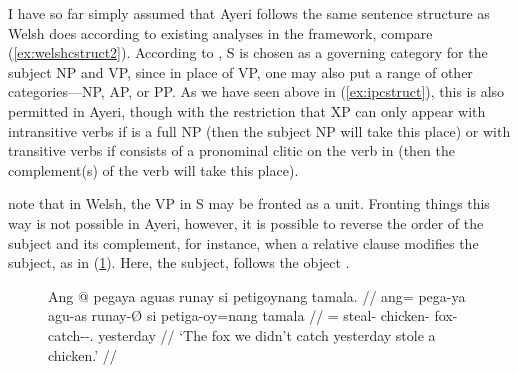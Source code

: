 I have so far simply assumed that Ayeri follows the same sentence structure as
Welsh does according to existing analyses in the \Lfg{} framework, compare
(\ref{ex:welshcstruct2}). According to \citet[130]{bresnan2016}, S is chosen as
a governing category for the subject NP and VP, since in place of VP, one may
also put a range of other categories---NP, AP, or PP. As we have seen above in
(\ref{ex:ipcstruct}), this is also permitted in Ayeri, though with the
restriction that XP can only appear with intransitive verbs if \Subj{} is a
full NP (then the subject NP will take this place) or with transitive verbs if
\Subj{} consists of a pronominal clitic on the verb in  (then the
complement(s) of the verb will take this place).


\citet{bresnan2016} note that in Welsh, the VP in S may be fronted as a unit.
Fronting things this way is not possible in Ayeri, however, it is possible to
reverse the order of the subject and its complement, for instance, when a
relative clause modifies the subject, as in (\ref{ex:ayrsinv}). Here, the
subject,  follows the
object .

\begin{figure}
\ex\label{ex:ayrsinv}\begingl
	\gla Ang @ pegaya aguas runay si petigoynang tamala. //
	\glb ang= pega-ya agu-as runay-Ø si petiga-oy=nang tamala //
	\glc \AgtT{}= steal-\TsgM{} chicken-\Parg{} fox-\Top{} \Rel{}
		catch-\Neg{}-\Fpl {}.\Aarg{} yesterday //
	\glft `The fox we didn't catch yesterday stole a chicken.' //
\endgl\xe
\end{figure}

